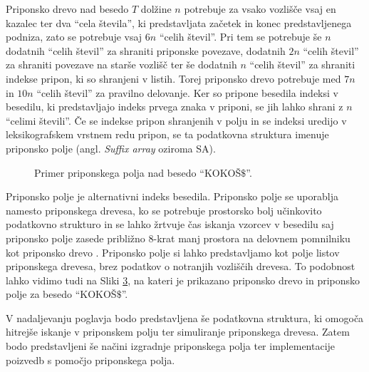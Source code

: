 Priponsko drevo nad besedo $T$ dolžine $n$ potrebuje za vsako vozlišče vsaj en kazalec ter dva \enquote{cela števila}, ki predstavljata začetek in konec predstavljenega podniza, zato se potrebuje vsaj $6n$ \enquote{celih števil}. Pri tem se potrebuje še $n$ dodatnih \enquote{celih števil} za shraniti priponske povezave, dodatnih $2n$ \enquote{celih števil} za shraniti povezave na starše vozlišč ter še dodatnih $n$ \enquote{celih števil} za shraniti indekse pripon, ki so shranjeni v listih. Torej priponsko drevo potrebuje med $7n$ in $10n$ \enquote{celih števil} za pravilno delovanje. Ker so pripone besedila indeksi v besedilu, ki predstavljajo indeks prvega znaka v priponi, se jih lahko shrani z $n$ \enquote{celimi števili}. Če se indekse pripon shranjenih v polju in se indeksi uredijo v leksikografskem vrstnem redu pripon, se ta podatkovna struktura imenuje priponsko polje (angl. \textit{Suffix array} oziroma SA).

\begin{figure}[htb]
    \begin{subfigure}[t]{\linewidth}
        
        
        \centering
        \subcaption*{}
        \label{fig:bSADrevo}
    \end{subfigure}
    \begin{subfigure}[t]{1\linewidth}        
        
        \centering
        \subcaption*{}
        \label{fig:bSAPolje}
    \end{subfigure}
    \caption{Primer priponskega polja nad besedo \enquote{KOKOŠ$\$$}.} 
    \label{fig:SuffuxArray}
\end{figure}

Priponsko polje je alternativni indeks besedila. Priponsko polje se uporablja namesto priponskega drevesa, ko se potrebuje prostorsko bolj učinkovito podatkovno strukturo in se lahko žrtvuje čas iskanja vzorcev v besedilu saj priponsko polje zasede približno 8-krat manj prostora na delovnem pomnilniku kot priponsko drevo \cite{Manber1990}. Priponsko polje si lahko predstavljamo kot polje listov priponskega drevesa, brez podatkov o notranjih vozliščih drevesa. To podobnost lahko vidimo tudi na Sliki \ref{fig:SuffuxArray}, na kateri je prikazano priponsko drevo in priponsko polje za besedo \enquote{KOKOŠ$\$$}.

V nadaljevanju poglavja bodo predstavljena še podatkovna struktura, ki omogoča hitrejše iskanje v priponskem polju ter simuliranje priponskega drevesa. Zatem bodo predstavljeni še načini izgradnje priponskega polja ter implementacije poizvedb s pomočjo priponskega polja.

